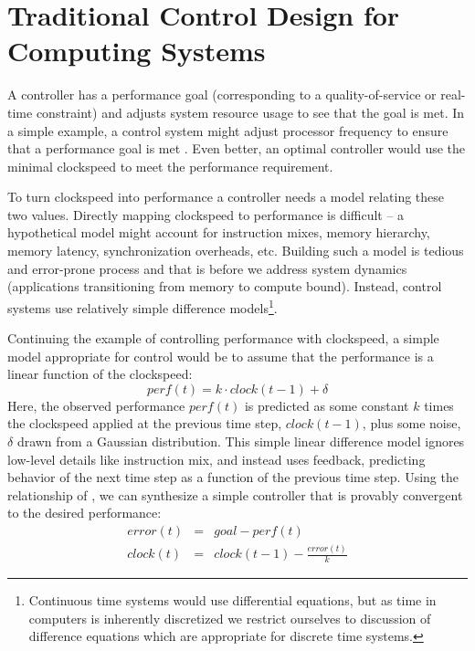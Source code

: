 \section{Traditional Control Design for Computing Systems}
A controller has a performance goal (corresponding to a
quality-of-service or real-time constraint) and adjusts system resource
usage to see that the goal is met.  In a simple example, a control
system might adjust processor frequency to ensure that a performance
goal is met \cite{lefurgy}.  Even better, an optimal controller would
use the minimal clockspeed to meet the performance requirement.

To turn clockspeed into performance a controller needs a model
relating these two values.  Directly mapping clockspeed to performance
is difficult -- a hypothetical model might account for instruction
mixes, memory hierarchy, memory latency, synchronization overheads,
etc.  Building such a model is tedious and error-prone process and
that is before we address system dynamics (\eg applications
transitioning from memory to compute bound).  Instead, control systems
use relatively simple difference models\footnote{Continuous time
  systems would use differential equations, but as time in computers
  is inherently discretized we restrict ourselves to discussion of
  difference equations which are appropriate for discrete time
  systems.}. 

Continuing the example of controlling performance with clockspeed, a
simple model appropriate for control would be to assume that the
performance is a linear function of the clockspeed:
\begin{equation}
  perf(t) = k \cdot clock(t-1) + \delta \label{eqn:clock}
\end{equation}
Here, the observed performance $perf(t)$ is predicted as some constant
$k$ times the clockspeed applied at the previous time step,
$clock(t-1)$, plus some noise, $\delta$ drawn from a Gaussian
distribution.  This simple linear difference model ignores low-level
details like instruction mix, and instead uses feedback, predicting
behavior of the next time step as a function of the previous time
step.  Using the relationship of , we can synthesize a
simple controller that is provably convergent to the desired
performance:
\begin{eqnarray}
  error(t) &=& goal - perf(t) \label{eqn:clock-error} \\
  clock(t) &=& clock(t-1) - \frac{error(t)}{k}
  \label{eqn:clock-control}
\end{eqnarray}


